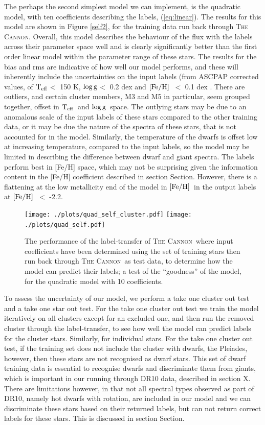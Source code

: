 \documentclass[12pt, preprint]{aastex}
\newcommand{\sectionname}{Section}
\newcommand{\teff}{\mbox{$\rm T_{eff}$}}
\newcommand{\feh}{\mbox{$\rm [Fe/H]$}}
\newcommand{\logg}{\mbox{$\rm \log g$}}
\newcommand{\tc}{\textsc{The Cannon}}
\begin{document}
The perhaps the second simplest model we can implement, is the quadratic model, with ten coefficients describing the labels, (\ref{eq:linear}). The results for this model are shown in Figure \ref{self2}, for the training data run back through \tc. Overall, this model describes the behaviour of the flux with the labels across their parameter space well and is clearly significantly better than the first order linear model within the parameter range of these stars. The results for the bias and rms are indicative of how well our model performs, and these will inherently include the uncertainties on the input labels (from ASCPAP corrected values, of \teff $<$ 150 K, \logg $<$ 0.2 dex and \feh\ $<$ 0.1 dex \citep{Meszaros2013}. There are outliers, and certain cluster members, M3 and M5 in particular, seem grouped together, offset in \teff\ and \logg\ space. The outlying stars may be due to an anomalous scale of the input labels of these stars compared to the other training data, or it may be due the nature of the spectra of these stars, that is not accounted for in the model. Similarly, the temperature of the dwarfs is offset low at increasing temperature, compared to the input labels, so the model may be limited in describing the difference between dwarf and giant spectra. The labels perform best in [Fe/H] space, which may not be surprising given the information content in the [Fe/H] coefficient described in section \sectionname{}. However, there is a flattening at the low metallicity end of the model in \feh\ in the output labels at \feh\ $<$ -2.2. 


\begin{figure}[h!]
\centering
    \texttt{[image: ./plots/quad\_self\_cluster.pdf]}
  \texttt{[image: ./plots/quad\_self.pdf]}
\caption{The performance of the label-transfer of \tc\, where input coefficients have been determined using the set of training stars then run back through \tc\ as test data, to determine how the model can predict their labels; a test of the ``goodness'' of the model, for the quadratic model with 10 coefficients.}
\label{fig:self2}
\end{figure}

To assess the uncertainty of our model, we perform a take one cluster out test and a take one star out test. For the take one cluster out test we train the model iteratively on all clusters except for an excluded one, and then run the removed cluster through the label-transfer, to see how well the model can predict labels for the cluster stars. Similarly, for individual stars.  For the take one cluster out test, if the training set does not include the cluster with dwarfs, the Pleiades, however, then these stars are not recognised as dwarf stars. This set of dwarf training data is essential to recognise dwarfs and discriminate them from giants, which is important in our running through DR10 data, described in section X. There are limitations however, in that not all spectral types observed as part of DR10, namely hot dwarfs with rotation, are included in our model and we can discriminate these stars based on their returned labels, but can not return correct labels for these stars. This is discussed in section \sectionname{}. 
\end{document}
